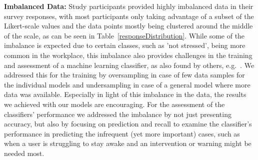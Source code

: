 \noindent
\textbf{Imbalanced Data:}
Study participants provided highly imbalanced data in their survey responses, with most participants only taking advantage of a subset of the Likert-scale values and the data points mostly being clustered around the middle of the scale, as can be seen in Table~\ref{responseDistribution}. While some of the imbalance is expected due to certain classes, such as 'not stressed', being more common in the workplace, this imbalance also provides challenges in the training and assessment of a machine learning classifier, as also found by others, e.g.~\cite{Exler16}. We addressed this for the training by oversampling in case of few data samples for the individual models and undersampling in case of a general model where more data was available. Especially in light of this imbalance in the data, the results we achieved with our models are encouraging. For the assessment of the classifiers' performance we addressed the imbalance by not just presenting accuracy, but also by focusing on prediction and recall to examine the classifier's performance in predicting the infrequent (yet more important) cases, such as when a user is struggling to stay awake and an intervention or warning might be needed most. 

